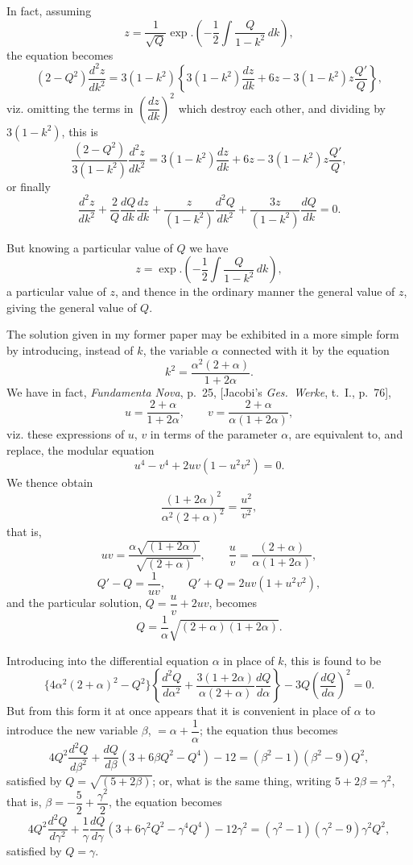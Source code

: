 \documentclass[11pt,a4paper]{book}
\begin{document}
In fact, assuming
\[
z = \frac{1}{\sqrt{Q}} \exp.\left(-\frac{1}{2}\int\frac{Q}{1-k^2}\,dk\right),
\]
the equation becomes
\[
(2-Q^2)\frac{d^2z}{dk^2}
  = 3(1-k^2)\left\{
      3(1-k^2)\frac{dz}{dk}
      + 6z
      - 3(1-k^2)z\frac{Q'}{Q}
    \right\},
\]
viz. omitting the terms in $\left(\dfrac{dz}{dk}\right)^2$ which destroy each
other, and dividing by $3(1-k^2)$, this is
\[
\frac{(2-Q^2)}{3(1-k^2)}\frac{d^2z}{dk^2}
  = 3(1-k^2)\frac{dz}{dk} + 6z - 3(1-k^2)z\frac{Q'}{Q},
\]
or finally
\[
\frac{d^2z}{dk^2}
  + \frac{2}{Q}\frac{dQ}{dk}\frac{dz}{dk}
  + \frac{z}{(1-k^2)}\frac{d^2Q}{dk^2}
  + \frac{3z}{(1-k^2)}\frac{dQ}{dk} = 0.
\]

But knowing a particular value of $Q$ we have
\[
z = \exp.\left(-\frac{1}{2}\int\frac{Q}{1-k^2}\,dk\right),
\]
a particular value of $z$, and thence in the ordinary manner the general
value of $z$, giving the general value of $Q$.

The solution given in my former paper may be exhibited in a more simple form
by introducing, instead of $k$, the variable $\alpha$ connected with it by the
equation
\[
k^2 = \frac{\alpha^2(2+\alpha)}{1+2\alpha}.
\]
We have in fact, \textit{Fundamenta Nova}, p.~25, [Jacobi's \textit{Ges.\ Werke},
t.~I., p.~76],
\[
u = \frac{2+\alpha}{1+2\alpha}, \qquad v = \frac{2+\alpha}{\alpha(1+2\alpha)},\]
viz. these expressions of $u$, $v$ in terms of the parameter $\alpha$, are
equivalent to, and replace, the modular equation
\[u^4 - v^4 + 2uv(1-u^2v^2) = 0.\]
We thence obtain
\[
\frac{(1+2\alpha)^2}{\alpha^2(2+\alpha)^2} = \frac{u^2}{v^2},
\]
that is,
\[
uv = \frac{\alpha\sqrt{(1+2\alpha)}}{\sqrt{(2+\alpha)}}, \qquad
\frac{u}{v} = \frac{(2+\alpha)}{\alpha(1+2\alpha)},
\]
\[
Q'-Q = \frac{1}{uv}, \qquad
Q'+Q = 2uv(1+u^2v^2),
\]
and the particular solution, $Q = \dfrac{u}{v} + 2uv$, becomes
\[Q = \frac{1}{\alpha}\sqrt{(2+\alpha)(1+2\alpha)}.\]

Introducing into the differential equation $\alpha$ in place of $k$, this is
found to be
\[
\{4\alpha^2(2+\alpha)^2 - Q^2\}
  \left\{
    \frac{d^2Q}{d\alpha^2}
    + \frac{3(1+2\alpha)}{\alpha(2+\alpha)}\frac{dQ}{d\alpha}
  \right\}
  - 3Q\left(\frac{dQ}{d\alpha}\right)^2 = 0.
\]
But from this form it at once appears that it is convenient in place of
$\alpha$ to introduce the new variable $\beta$, $=\alpha+\dfrac{1}{\alpha}$; the
equation thus becomes
\[
4Q^2\frac{d^2Q}{d\beta^2}
  + \frac{dQ}{d\beta}(3+6\beta Q^2-Q^4) - 12 = (\beta^2-1)(\beta^2-9)Q^2,
\]
satisfied by $Q=\sqrt{(5+2\beta)}$; or, what is the same thing, writing
$5+2\beta=\gamma^2$, that is, $\beta=-\dfrac{5}{2}+\dfrac{\gamma^2}{2}$, the
equation becomes
\[
4Q^2\frac{d^2Q}{d\gamma^2}
  + \frac{1}{\gamma}
    \frac{dQ}{d\gamma}(3+6\gamma^2Q^2-\gamma^4Q^4) - 12\gamma^2
  = (\gamma^2-1)(\gamma^2-9)\gamma^2Q^2,
\]
satisfied by $Q=\gamma$.
\end{document}
